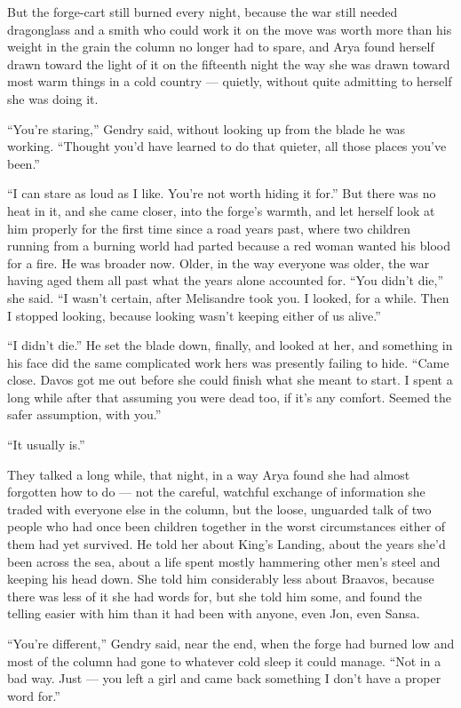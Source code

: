 But the forge-cart still burned every night, because the war still needed dragonglass and a smith who could work it on the move was worth more than his weight in the grain the column no longer had to spare, and Arya found herself drawn toward the light of it on the fifteenth night the way she was drawn toward most warm things in a cold country — quietly, without quite admitting to herself she was doing it.

“You’re staring,” Gendry said, without looking up from the blade he was working. “Thought you’d have learned to do that quieter, all those places you’ve been.”

“I can stare as loud as I like. You’re not worth hiding it for.” But there was no heat in it, and she came closer, into the forge’s warmth, and let herself look at him properly for the first time since a road years past, where two children running from a burning world had parted because a red woman wanted his blood for a fire. He was broader now. Older, in the way everyone was older, the war having aged them all past what the years alone accounted for. “You didn’t die,” she said. “I wasn’t certain, after Melisandre took you. I looked, for a while. Then I stopped looking, because looking wasn’t keeping either of us alive.”

“I didn’t die.” He set the blade down, finally, and looked at her, and something in his face did the same complicated work hers was presently failing to hide. “Came close. Davos got me out before she could finish what she meant to start. I spent a long while after that assuming you were dead too, if it’s any comfort. Seemed the safer assumption, with you.”

“It usually is.”

\sceneBreak

They talked a long while, that night, in a way Arya found she had almost forgotten how to do — not the careful, watchful exchange of information she traded with everyone else in the column, but the loose, unguarded talk of two people who had once been children together in the worst circumstances either of them had yet survived. He told her about King’s Landing, about the years she’d been across the sea, about a life spent mostly hammering other men’s steel and keeping his head down. She told him considerably less about Braavos, because there was less of it she had words for, but she told him some, and found the telling easier with him than it had been with anyone, even Jon, even Sansa.

“You’re different,” Gendry said, near the end, when the forge had burned low and most of the column had gone to whatever cold sleep it could manage. “Not in a bad way. Just — you left a girl and came back something I don’t have a proper word for.”

